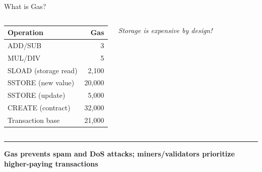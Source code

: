 \documentclass[8pt,aspectratio=169]{beamer}
\newcommand{\bottomnote}[1]{%
\vfill
\vspace{-2mm}
\textcolor{mllavender2}{\rule{\textwidth}{0.4pt}}
\vspace{1mm}
\footnotesize
\textbf{#1}
}
\begin{document}
\begin{frame}[t]{What is Gas?}
\begin{columns}[T]
\begin{center}
\begin{tabular}{lr}
\toprule
\textbf{Operation} & \textbf{Gas} \\
\midrule
ADD/SUB & 3 \\
MUL/DIV & 5 \\
SLOAD (storage read) & 2,100 \\
SSTORE (new value) & 20,000 \\
SSTORE (update) & 5,000 \\
CREATE (contract) & 32,000 \\
Transaction base & 21,000 \\
\bottomrule
\end{tabular}
\end{center}

\vspace{0.3em}
\textit{Storage is expensive by design!}
\end{columns}

\bottomnote{Gas prevents spam and DoS attacks; miners/validators prioritize higher-paying transactions}
\end{frame}
\end{document}
